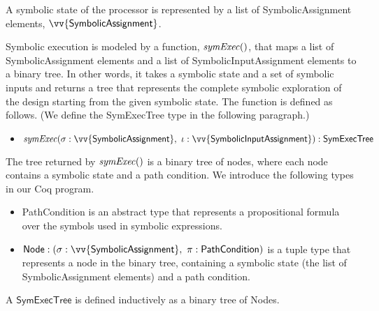 A symbolic state of the processor is represented by a list of
\textsf{SymbolicAssignment} elements, $\vv{\textsf{SymbolicAssignment}}$. 



Symbolic execution is modeled by a function, $\mathit{symExec}()$, that maps a list
of \textsf{SymbolicAssignment} elements and a list of
\textsf{SymbolicInputAssignment} elements to a binary tree. In other words, it
takes a symbolic state and a set of symbolic inputs and returns a tree that
represents the complete symbolic exploration of the design starting from the given symbolic state. The function is defined as
follows. (We define the \textsf{SymExecTree} type in the following paragraph.)

\begin{itemize}
\item $\symexecution (\sigma: \vv{\textsf{SymbolicAssignment}},~ 
  \iota: \vv{\textsf{SymbolicInputAssignment}}) : \textsf{SymExecTree}$
\end{itemize}

The tree returned by $\mathit{symExec}()$ is a binary tree of nodes, where each
node contains a symbolic state and a path condition. We introduce the following
types in our Coq program.

\begin{itemize}
\item \textsf{PathCondition} is an abstract type that represents a
  propositional formula over the symbols used in symbolic expressions.
\item $\textsf{Node} : (\sigma : \vv{\textsf{SymbolicAssignment}},~ \pi :
  \textsf{PathCondition})$ is a tuple type that represents a node in the
  binary tree, containing a symbolic state (the list of
  \textsf{SymbolicAssignment} elements) and a path condition.
\end{itemize}

A $\textsf{SymExecTree}$ is defined inductively as a binary tree of \textsf{Node}s.





